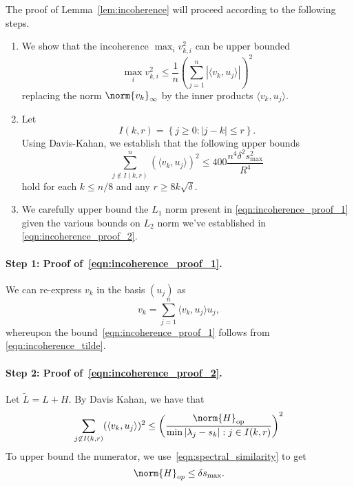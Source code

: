 \documentclass{article}
\newcommand{\abs}[1]{\left \lvert #1 \right \rvert}
\newcommand{\set}[1]{\left\{#1\right\}}
\newcommand{\dotp}[2]{\langle #1, #2 \rangle}
\newcommand{\1}{\mathbf{1}}
\theoremstyle{alden}
\theoremstyle{aldenthm}
\theoremstyle{definition}
\theoremstyle{remark}
\begin{document}
The proof of Lemma~\ref{lem:incoherence} will proceed according to the following steps.
\begin{enumerate}
	\item We show that the incoherence $\max_{i} v_{k,i}^2$ can be upper bounded
	\begin{equation}
	\label{eqn:incoherence_proof_1}
	\max_{i} v_{k,i}^2 \leq \frac{1}{n} \left(\sum_{j = 1}^{n} \abs{\dotp{v_k}{u_j}}\right)^2
	\end{equation}
	replacing the norm $\norm{v_k}_{\infty}$ by the inner products $\dotp{v_k}{u_j}$.
	\item Let
	\begin{equation*}
	I(k,r) = \set{j \geq 0: \abs{j - k} \leq r}.
	\end{equation*}
	Using Davis-Kahan, we establish that the following upper bounds
	\begin{equation}
	\label{eqn:incoherence_proof_2}
	\sum_{j \not\in I(k,r)}^{n} (\dotp{v_k}{u_j})^2 \leq 400 \frac{n^4 \delta^2 s_{\max}^2}{R^4}
	\end{equation}
	hold for each $k \leq n/8$ and any $r \geq 8k\sqrt{\delta}$. 
	\item We carefully upper bound the $L_1$ norm present in \eqref{eqn:incoherence_proof_1} given the various bounds on $L_2$ norm we've established in \eqref{eqn:incoherence_proof_2}.
\end{enumerate}

\paragraph{Step 1: Proof of~\eqref{eqn:incoherence_proof_1}.}

We can re-express $v_k$ in the basis $(u_j)$ as
\begin{equation*}
v_k = \sum_{j = 1}^{n} \dotp{v_k}{u_j} u_j,
\end{equation*}
whereupon the bound~\eqref{eqn:incoherence_proof_1} follows from \eqref{eqn:incoherence_tilde}. 
\paragraph{Step 2: Proof of~\eqref{eqn:incoherence_proof_2}.}

Let $\widetilde{L} = L + H$. By Davis Kahan, we have that
\begin{equation}
\label{eqn:davis_kahan}
\sum_{j \not\in I(k,r)} (\dotp{v_k}{u_j})^2 \leq \left(\frac{\norm{H}_{\textrm{op}}}{\min{\abs{\lambda_j - s_k}:j \in I(k,r)}}\right)^2
\end{equation}
To upper bound the numerator, we use~\eqref{eqn:spectral_similarity} to get
\begin{equation*}
\norm{H}_{op} \leq \delta s_{\max}.
\end{equation*}
\end{document}
